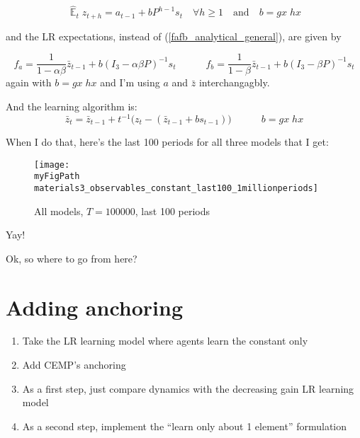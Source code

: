 \documentclass[11pt]{article}
\def \myFigPath {../figures/}
\renewcommand{\[}{\begin{equation}}
\renewcommand{\]}{\end{equation}}
\DeclareMathOperator{\E}{\mathbb{E}}
\def\myFigScale{0.3}
\begin{document}
 \begin{equation}
\hat{\E}_t z_{t+h} = a_{t-1} + bP^{h-1}s_t  \quad \forall h\geq 1 \quad \text{and} \quad b=gx \; hx \label{PLM_fcst_constant}
\end{equation}
 
 and the LR expectations, instead of (\ref{fafb_analytical_general}), are given by
 
 \begin{equation}
f_a = \frac{1}{1-\alpha\beta}\bar{z}_{t-1}  + b(I_3 - \alpha\beta P)^{-1}s_t \quad \quad \quad f_b = \frac{1}{1-\beta}\bar{z}_{t-1}  + b(I_3 - \beta P)^{-1}s_t  \label{fafb_analytical_constant}
\end{equation}
 again with $b= gx\;hx$ and I'm using $a$ and $\bar{z}$ interchangagbly.
 
 And the learning algorithm is:
 \begin{equation}
\bar{z}_{t} = \bar{z}_{t-1} +t^{-1}\big(z_{t} -(\bar{z}_{t-1}+bs_{t-1}) \big) \quad  \quad \quad b= gx\;hx \label{RLS_constant}
\end{equation}
 
 \newpage
 When I do that, here's the last 100 periods for all three models that I get:
\begin{figure}[h!]
\texttt{[image: \\myFigPath materials3\_observables\_constant\_last100\_1millionperiods]} 
\caption{All models, $T = 100000$, last 100 periods}
\end{figure}
 Yay!
 
 Ok, so where to go from here?

\section{Adding anchoring}
 \begin{enumerate}
 \item Take the LR learning model where agents learn the constant only
 \item Add CEMP's anchoring
 \item As a first step, just compare dynamics with the decreasing gain LR learning model
 \item As a second step, implement the ``learn only about 1 element'' formulation
 \end{enumerate}
\end{document}
